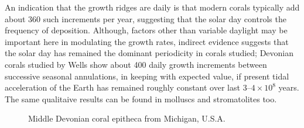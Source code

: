 \documentclass[11pt]{article}
\begin{document}
An indication that the growth ridges are daily is that modern corals typically add about 360 such increments per year, suggesting that the solar day controls the frequency of deposition\cite{Wells1963,Barnes1972}. Although, factors other than variable daylight may be important here in modulating the growth rates, indirect evidence suggests that the solar day has remained the dominant periodicity in corals studied; Devonian corals studied by Wells\cite{Wells1963} show about 400 daily growth increments between successive seasonal annulations, in keeping with expected value, if present tidal acceleration of the Earth has remained roughly constant over last $3\textrm{--}4 \times 10^8$ years. The same qualitaive results can be found in molluscs and stromatolites too.
\begin{figure}
\begin{center}
\caption{Middle Devonian coral epitheca from Michigan, U.S.A.}
\label{}
\end{center}
\end{figure}

\end{document}
